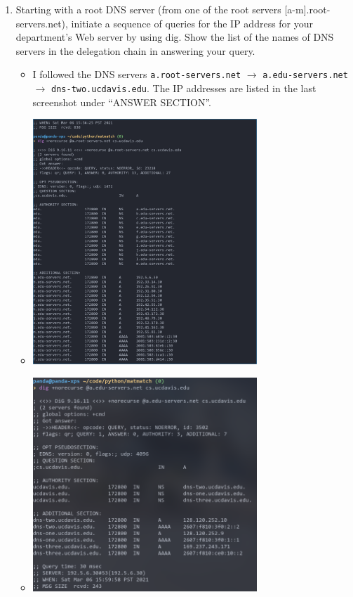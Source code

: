 \documentclass[11pt]{article}
\begin{document}
\begin{enumerate}[label=(\alph*)]
\item Starting with a root DNS server (from one of the root servers
  [a-m].root-servers.net), initiate a sequence of queries for the IP address for
  your department’s Web server by using dig. Show the list of the names of DNS
  servers in the delegation chain in answering your query.
  \begin{itemize}
  \item I followed the DNS servers \texttt{a.root-servers.net} $\rightarrow$
    \texttt{a.edu-servers.net} $\rightarrow$ \texttt{dns-two.ucdavis.edu}.  The IP
    addresses are listed in the last screenshot under ``ANSWER SECTION''.
  \item \includegraphics[width=0.7\textwidth]{img/dig-ucd-1}
  \item \includegraphics[width=0.7\textwidth]{img/dig-ucd-2}

\end{itemize}
\end{enumerate}
\end{document}

